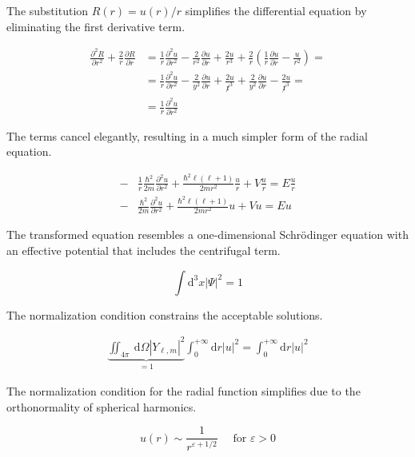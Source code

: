 \documentclass[italian]{HKNdocument}
\begin{document}
The substitution $R(r) = u(r)/r$ simplifies the differential equation by eliminating the first derivative term.

\begin{align*}
\frac{\partial^{2} R}{\partial r^{2}}+\frac{2}{r} \frac{\partial R}{\partial r} & =\frac{1}{r} \frac{\partial^{2} u}{\partial r^{2}}-\frac{2}{r^{2}} \frac{\partial u}{\partial r}+\frac{2 u}{r^{3}}+\frac{2}{r}\left(\frac{1}{r} \frac{\partial u}{\partial r}-\frac{u}{r^{2}}\right)= \\
& =\frac{1}{r} \frac{\partial^{2} u}{\partial r^{2}}-\frac{2}{y^{2}} \frac{\partial u}{\partial r}+\frac{2 u}{\not r^{3}}+\frac{2}{y^{2}} \frac{\partial u}{\partial r}-\frac{2 u}{\not r^{3}}=  \tag{9.35}\\
& =\frac{1}{r} \frac{\partial^{2} u}{\partial r^{2}}
\end{align*}

The terms cancel elegantly, resulting in a much simpler form of the radial equation.

\begin{align*}
- & \frac{1}{r} \frac{\hbar^{2}}{2 m} \frac{\partial^{2} u}{\partial r^{2}}+\frac{\hbar^{2} \ell(\ell+1)}{2 m r^{2}} \frac{u}{r}+V \frac{u}{r}=E \frac{u}{r}  \tag{9.36}\\
- & \frac{\hbar^{2}}{2 m} \frac{\partial^{2} u}{\partial r^{2}}+\frac{\hbar^{2} \ell(\ell+1)}{2 m r^{2}} u+V u=E u
\end{align*}

The transformed equation resembles a one-dimensional Schrödinger equation with an effective potential that includes the centrifugal term.

\begin{equation*}
\int \mathrm{d}^{3} x|\Psi|^{2}=1 \tag{9.37}
\end{equation*}

The normalization condition constrains the acceptable solutions.

\begin{align*}
\underbrace{\iint_{4 \pi} \mathrm{~d} \Omega\left|Y_{\ell, m}\right|^{2}}_{=1} \int_{0}^{+\infty} \mathrm{d} r |u|^{2} = \int_{0}^{+\infty} \mathrm{d} r|u|^{2} \tag{9.38}
\end{align*}

The normalization condition for the radial function simplifies due to the orthonormality of spherical harmonics.

\begin{equation*}
u(r) \sim \frac{1}{r^{\varepsilon+1 / 2}} \quad \text { for } \varepsilon>0 \tag{9.39}
\end{equation*}
\end{document}
